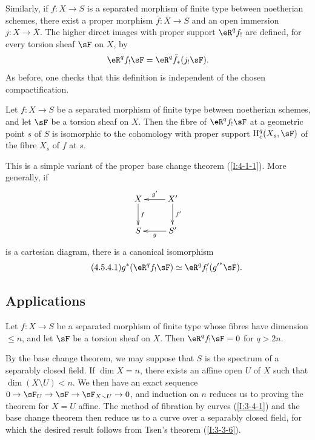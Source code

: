 Similarly, if $f:X\to S$ is a separated morphism of finite type between
noetherian schemes, there exist a proper morphism $\bar f:\bar X\to S$
and an open immersion $j:X\to\bar X$. The higher direct images with
proper support $\eR^qf_!$ are defined, for every torsion sheaf $\sF$ on
$X$, by
\[
  \eR^q f_! \sF = \eR^q \bar f_*(j_! \sF) \text{.}
\]
As before, one checks that this definition is independent of the chosen
compactification.

\begin{theorem}\label{I:4-5-4}
Let $f:X\to S$ be a separated morphism of finite type between noetherian
schemes, and let $\sF$ be a torsion sheaf on $X$. Then the fibre of
$\eR^qf_!\sF$ at a geometric point $s$ of $S$ is isomorphic to the
cohomology with proper support $\h_c^q(X_s,\sF)$ of the fibre $X_s$ of
$f$ at $s$.
\end{theorem}

This is a simple variant of the proper base change theorem
(\ref{I:4-1-1}). More generally, if
\[\xymatrix{
  X \ar[d]^-f
    & X' \ar[l]_-{g'} \ar[d]^-{f'} \\
  S
    & S' \ar[l]^-g
}\]
is a cartesian diagram, there is a canonical isomorphism
\begin{equation*}\tag{4.5.4.1}\label{I:eq:4-5-4-1}
  g^* (\eR^q f_! \sF) \simeq \eR^q f'_!({g'}^* \sF) \text{.}
\end{equation*}

\subsection{Applications}\label{I:4-6}

\begin{theorem}\label{I:4-6-1}
Let $f:X\to S$ be a separated morphism of finite type whose fibres have
dimension $\leqslant n$, and let $\sF$ be a torsion sheaf on $X$. Then
$\eR^qf_!\sF=0$ for $q>2n$.
\end{theorem}

By the base change theorem, we may suppose that $S$ is the spectrum of a
separably closed field. If $\dim X=n$, there exists an affine open
$U$ of $X$ such that $\dim(X\setminus U)<n$. We then have an exact
sequence $0\to\sF_U\to\sF\to\sF_{X\setminus U}\to0$, and induction on
$n$ reduces us to proving the theorem for $X=U$ affine. The method of
fibration by curves (\ref{I:3-4-1}) and the base change theorem then
reduce us to a curve over a separably closed field, for which the desired
result follows from Tsen's theorem (\ref{I:3-3-6}).

